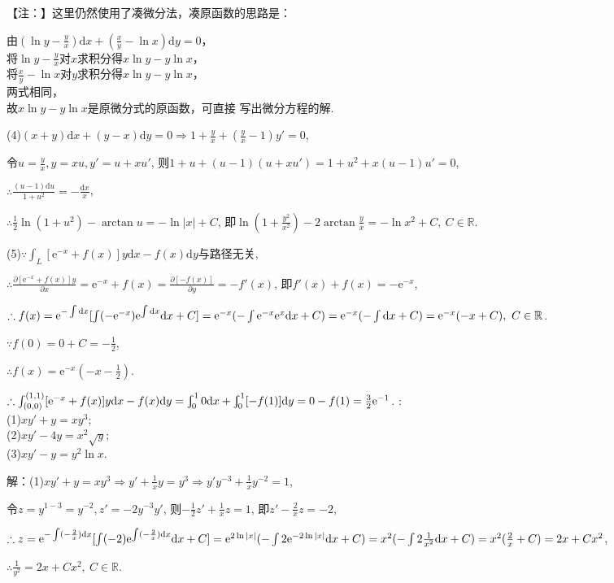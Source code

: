 \documentclass[12pt,UTF8]{ctexart}
\newcommand{\Int}[4]{\varint\nolimits_{#1}^{#2}#3\mathrm d#4}
\newcommand{\md}[1]{\mathrm d#1}
\newcommand{\ppx}[1]{\frac{\partial #1}{\partial x}}
\newcommand{\ppy}[1]{\frac{\partial #1}{\partial y}}
\newcommand{\me}[0]{\mathrm e}
\begin{document}
\begin{enumerate}
【注：】这里仍然使用了凑微分法，凑原函数的思路是：

由$(\ln y-\frac yx)\md x+(\frac xy-\ln x)\md y=0$，\\将$\ln y-\frac yx$对$x$求积分得$x\ln y-y\ln x$，\\将$\frac xy-\ln x$对$y$求积分得$x\ln y-y\ln x$，\\两式相同，\\故$x\ln y-y\ln x$是原微分式的原函数，可直接 写出微分方程的解.

(4)$(x+y)\md x+(y-x)\md y=0\Rightarrow1+\frac yx+(\frac yx-1)y'=0$,

令$u=\frac yx,y=xu,y'=u+xu'$, 则$1+u+(u-1)(u+xu')=1+u^2+x(u-1)u'=0$,

$\therefore\frac{(u-1)\md u}{1+u^2}=-\frac{\md x}x$,

$\therefore\frac12\ln(1+u^2)-\arctan u=-\ln|x|+C$, 即$\ln(1+\frac{y^2}{x^2})-2\arctan\frac yx=-\ln x^2+C,\ C\in\mathbb R$.

(5)$\because\int_L[\me^{-x}+f(x)]y\md x-f(x)\md y$与路径无关,

$\therefore\ppx{[\me^{-x}+f(x)]y}=\me^{-x}+f(x)=\ppy{[-f(x)]}=-f'(x)$, 即$f'(x)+f(x)=-\me^{-x}$,

$\therefore f(x)=\me^{-\int\md x}[\int(-\me^{-x})\me^{\int\md x}\md x+C]=\me^{-x}(-\int\me^{-x}\me^x\md x+C)=\me^{-x}(-\int\md x+C)\\
=\me^{-x}(-x+C),\ C\in\mathbb R$.

$\because f(0)=0+C=-\frac12$,

$\therefore f(x)=\me^{-x}(-x-\frac12)$.

$\therefore\int_{(0,0)}^{(1,1)}[\me^{-x}+f(x)]y\md x-f(x)\md y=\Int010x+\Int01{[-f(1)]}y=0-f(1)=\frac32\me^{-1}$.
:\\
(1)$xy'+y=xy^3$;\\
(2)$xy'-4y=x^2\sqrt y$;\\
(3)$xy'-y=y^2\ln x$.

解：(1)$xy'+y=xy^3\Rightarrow y'+\frac1xy=y^3\Rightarrow y'y^{-3}+\frac1xy^{-2}=1$,

令$z=y^{1-3}=y^{-2},z'=-2y^{-3}y'$, 则$-\frac12z'+\frac1xz=1$, 即$z'-\frac2xz=-2$,

$\therefore z=\me^{-\int(-\frac2x)\md x}[\int(-2)\me^{\int(-\frac2x)\md x}\md x+C]=\me^{2\ln|x|}(-\int2\me^{-2\ln|x|}\md x+C)\\
=x^2(-\int2\frac1{x^2}\md x+C)=x^2(\frac2x+C)=2x+Cx^2$,

$\therefore\frac1{y^2}=2x+Cx^2,\ C\in\mathbb R$.


\end{enumerate}
\end{document}
